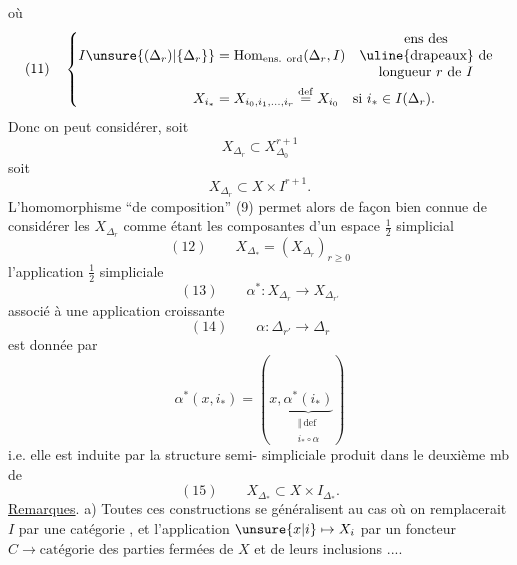 où
\[
(11)\quad\left\{\begin{aligned}
I\unsure{(\Delta_r)|\{\Delta_r\}}&=\operatorname{Hom}_{\text{ens. ord}}(\Delta_r,I)
\quad\begin{matrix}\text{ens des}\\\text{\uline{drapeaux} de}\\\text{longueur }r\text{ de }I\end{matrix}\\
X_{i_*}&=X_{i_0,i_1,\ldots,i_r}\overset{\mathrm{def}}{=}X_{i_0}\quad\text{si }i_*\in I(\Delta_r).
\end{aligned}\right.
\]
Donc on peut considérer, soit
\[
X_{\Delta_r}\subset X_{\Delta_0}^{r+1}
\]
soit
\[
X_{\Delta_r}\subset X\times I^{r+1}.
\]
L'homomorphisme ``de composition'' (9)
permet alors de façon bien connue de
considérer les $X_{\Delta_r}$ comme étant les
composantes d'un espace $\frac12$ simplicial
\[
(12)\qquad X_{\Delta_*}=(X_{\Delta_r})_{r\geq0}
\]
 l'application $\frac12$ simpliciale
\[
(13)\qquad\alpha^*:X_{\Delta_r}\longrightarrow X_{\Delta_{r'}}
\]
associé à une application croissante
\[
(14)\qquad\alpha:\Delta_{r'}\longrightarrow\Delta_r
\]
est donnée par
\[
\alpha^*(x,i_*)=(x,\underbrace{\alpha^*(i_*)}_{\substack{\Vert\,\mathrm{def}\\i_*\circ\alpha}})
\]
i.e. elle est induite par la structure semi-
simpliciale produit dans le deuxième mb de
\[
(15)\qquad X_{\Delta_*}\subset X\times I_{\Delta_*}.
\]
\uline{Remarques}. a) Toutes ces constructions se généralisent au
cas où on remplacerait  $I$ par une catégorie , et
l'application $\unsure{x|i}\mapsto X_i$ par un foncteur $C\longrightarrow\text{catégorie}$
des parties fermées de $X$ et de leurs inclusions
....

